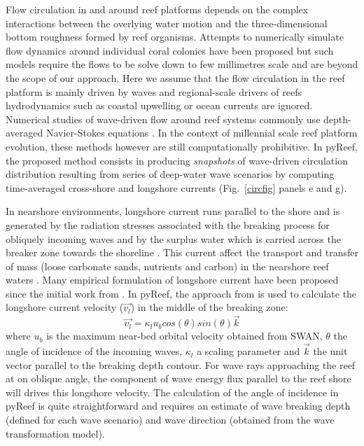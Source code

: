 \documentclass[default,jgrga]{agutex2015}
\begin{document}
\begin{article}
Flow circulation in and around reef platforms depends on the complex interactions between the overlying water motion and the three-dimensional bottom roughness formed by reef organisms. Attempts to numerically simulate flow dynamics around individual coral colonies have been proposed \citep{Kaandorp03, Chang09, Chindapol13} but such models require the flows to be solve down to few millimetres scale and are beyond the scope of our approach. Here we assume that the flow circulation in the reef platform is mainly driven by waves and regional-scale drivers of reefs hydrodynamics such as coastal upwelling or ocean currents are ignored. Numerical studies of wave-driven flow around reef systems commonly use depth-averaged Navier-Stokes equations \citep{Raupach82, Symonds95, Lowe05, Lowe09, Pomeroy12, Taebi11}. In the context of millennial scale reef platform evolution, these methods however are still computationally prohibitive. In pyReef, the proposed method consists in producing \textit{snapshots} of wave-driven circulation distribution resulting from series of deep-water wave scenarios by computing time-averaged cross-shore and longshore currents (Fig.~\ref{circfig} panels e and g).

In nearshore environments, longshore current runs parallel to the shore and is generated by the radiation stresses associated with the breaking process for obliquely incoming waves and by the surplus water which is carried across the breaker zone towards the shoreline \citep{Longuet-Higgins70}. This current affect the transport and transfer of mass (loose carbonate sands, nutrients and carbon) in the nearshore reef waters \citep{Hamner88, Monismith07, Lowe15}. Many empirical formulation of longshore current have been proposed since the initial work from   \citet{Longuet-Higgins64}  \citep{Komar70, Komar75, Galvin87, Reniers97, Ruessink01, Grasmeijer03}. In pyReef, the approach from \citet{Komar75} is used to calculate the longshore current velocity ($\vec{v_l}$) in the middle of the breaking zone:
\begin{equation}
\vec{v_l} = \kappa_l u_{b} cos(\theta) sin(\theta) \vec{k}
\end{equation}
where $u_b$ is the maximum near-bed orbital velocity obtained from SWAN, $\theta$ the angle of incidence of the incoming waves, $\kappa_l$  a scaling parameter and $\vec{k}$ the unit vector parallel to the breaking depth contour. For wave rays approaching the reef at on oblique angle, the component of wave energy flux parallel to the reef shore will drives this longshore velocity. The calculation of the angle of incidence in pyReef is quite straightforward and requires an estimate of wave breaking depth (defined for each wave scenario) and wave direction (obtained from the wave transformation model).


\end{article}
\end{document}
